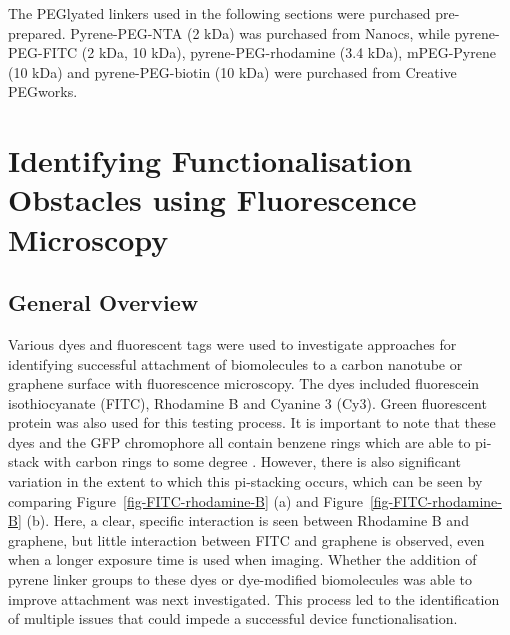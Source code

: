 \documentclass[
  a4paper,
]{scrbook}
\begin{document}
The PEGlyated linkers used in the following sections were purchased
pre-prepared. Pyrene-PEG-NTA (2 kDa) was purchased from Nanocs, while
pyrene-PEG-FITC (2 kDa, 10 kDa), pyrene-PEG-rhodamine (3.4 kDa),
mPEG-Pyrene (10 kDa) and pyrene-PEG-biotin (10 kDa) were purchased from
Creative PEGworks.

\hypertarget{sec-impediments}{%
\section{Identifying Functionalisation Obstacles using Fluorescence
Microscopy}\label{sec-impediments}}

\hypertarget{sec-fluorescence-remarks}{%
\subsection{General Overview}\label{sec-fluorescence-remarks}}

Various dyes and fluorescent tags were used to investigate approaches
for identifying successful attachment of biomolecules to a carbon
nanotube or graphene surface with fluorescence microscopy. The dyes
included fluorescein isothiocyanate (FITC), Rhodamine B and Cyanine 3
(Cy3). Green fluorescent protein was also used for this testing process.
It is important to note that these dyes and the GFP chromophore all
contain benzene rings which are able to pi-stack with carbon rings to
some degree
\autocite{Nakayama-Ratchford2007,Tang2012,Khrenova2019,Qiu2019}.
However, there is also significant variation in the extent to which this
pi-stacking occurs, which can be seen by comparing
Figure~\ref{fig-FITC-rhodamine-B} (a) and
Figure~\ref{fig-FITC-rhodamine-B} (b). Here, a clear, specific
interaction is seen between Rhodamine B and graphene, but little
interaction between FITC and graphene is observed, even when a longer
exposure time is used when imaging. Whether the addition of pyrene
linker groups to these dyes or dye-modified biomolecules was able to
improve attachment was next investigated. This process led to the
identification of multiple issues that could impede a successful device
functionalisation.
\end{document}
